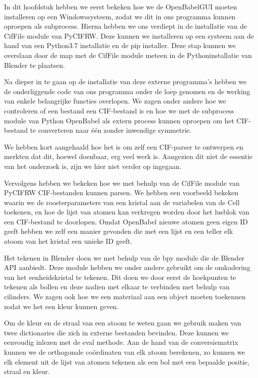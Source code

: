 In dit hoofdstuk hebben we eerst bekeken hoe we de OpenBabelGUI moeten installeren op een Windowssysteem, zodat we dit in ons programma kunnen oproepen als subprocess. Hierna hebben we ons verdiept in de installatie van de CifFile module van PyCIFRW. Deze kunnen we installeren op een systeem aan de hand van een Python3.7 installatie en de pip installer. Deze stap kunnen we overslaan door de map met de CifFile module meteen in de Pythoninstallatie van Blender te plaatsen.
\par
Na dieper in te gaan op de installatie van deze externe programma's hebben we de onderliggende code van ons programma onder de loep genomen en de werking van enkele belangrijke functies overlopen. We zagen onder andere hoe we controleren of een bestand een CIF-bestand is en hoe we met de subprocess module van Python OpenBabel als extern process kunnen oproepen om het CIF-bestand te converteren naar één zonder inwendige symmetrie. 
\par
We hebben kort aangehaald hoe het is om zelf een CIF-parser te ontwerpen en merkten dat dit, hoewel doenbaar, erg veel werk is. Aangezien dit niet de essentie van het onderzoek is, zijn we hier niet verder op ingegaan. 
\par 
Vervolgens hebben we bekeken hoe we met behulp van de CifFile module van PyCIFRW CIF-bestanden kunnen parsen. We hebben een voorbeeld bekeken waarin we de roosterparameters van een kristal aan de variabelen van de Cell toekenen, en hoe de lijst van atomen kan verkregen worden door het lusblok van een CIF-bestand te doorlopen. Omdat OpenBabel nieuwe atomen geen eigen ID geeft hebben we zelf een manier gevonden die met een lijst en een teller elk atoom van het kristal een unieke ID geeft.
\par 
Het tekenen in Blender doen we met behulp van de bpy module die de Blender API aanbiedt. Deze module hebben we onder andere gebruikt om de omkadering van het eenheidskristal te tekenen. Dit doen we door eerst de hoekpunten te tekenen als bollen en deze nadien met elkaar te verbinden met behulp van cilinders. We zagen ook hoe we een materiaal aan een object moeten toekennen zodat we het een kleur kunnen geven.
\par
Om de kleur en de straal van een atoom te weten gaan we gebruik maken van twee dictionaries die zich in externe bestanden bevinden. Deze kunnen we eenvoudig inlezen met de eval methode. Aan de hand van de conversiematrix kunnen we de orthogonale coördinaten van elk atoom berekenen, zo kunnen we elk element uit de lijst van atomen tekenen als een bol met een bepaalde positie, straal en kleur.
